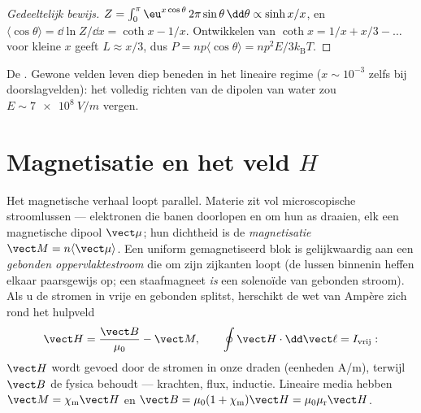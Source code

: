 \begin{proof}[Gedeeltelijk bewijs]
$Z = \int_0^\pi \eu^{x\cos\theta}\,2\pi\sin\theta\,\dd\theta \propto
\sinh x/x$, en $\langle\cos\theta\rangle = \dd\ln Z/\dd x = \coth x
- 1/x$. Ontwikkelen van $\coth x = 1/x + x/3 - \dots$ voor kleine $x$ geeft
$L \approx x/3$, dus $P = np\langle\cos\theta\rangle =
np^2E/3k_{\text{B}}T$.
\end{proof}

\begin{omfigure}

{\small De . Gewone velden leven diep beneden in het
lineaire regime ($x \sim 10^{-3}$ zelfs bij doorslagvelden): het volledig
richten van de dipolen van water zou
$E \sim \qty{7e8}{V/m}$ vergen.}
\end{omfigure}

\section{Magnetisatie en het veld \texorpdfstring{$H$}{H}}

\begin{definition}\label{def:b3:electromagnetism-in-matter:magnetisation}
Het magnetische verhaal loopt parallel. Materie zit vol microscopische
stroomlussen --- elektronen die banen doorlopen en om hun as draaien, elk een magnetische
dipool $\vect\mu$; hun dichtheid is de \emph{magnetisatie}
$\vect M = n\langle\vect\mu\rangle$. Een uniform gemagnetiseerd blok is
gelijkwaardig aan een \emph{gebonden oppervlaktestroom} die om zijn
zijkanten loopt (de lussen binnenin heffen elkaar paarsgewijs op; een staafmagneet \emph{is} een
solenoïde van gebonden stroom). Als u de stromen in vrije en gebonden splitst,
herschikt de wet van Ampère zich rond het hulpveld
\[
\vect H = \frac{\vect B}{\mu_0} - \vect M , \qquad
\oint \vect H\cdot\dd\vect\ell = I_{\text{vrij}} :
\]
$\vect H$ wordt gevoed door de stromen in onze draden (eenheden
\unit{A/m}), terwijl $\vect B$ de fysica behoudt --- krachten, flux,
inductie. Lineaire media hebben $\vect M = \chi_{\text{m}}\vect H$ en
$\vect B = \mu_0(1 + \chi_{\text{m}})\vect H =
\mu_0\mu_{\text{r}}\vect H$.
\end{definition}

